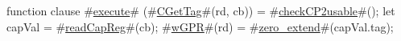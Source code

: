 function clause #\hyperref[zexecute]{execute}# (#\hyperref[zCGetTag]{CGetTag}#(rd, cb)) =
{
  #\hyperref[zcheckCP2usable]{checkCP2usable}#();
  let capVal = #\hyperref[zreadCapReg]{readCapReg}#(cb);
  #\hyperref[zwGPR]{wGPR}#(rd) = #\hyperref[zzzerozyextend]{zero\_extend}#(capVal.tag);
}
